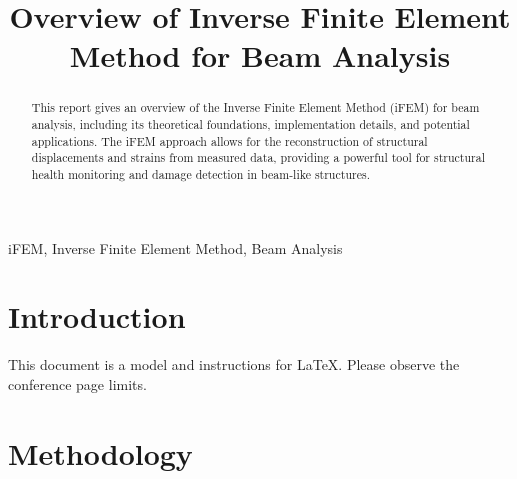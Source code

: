 \documentclass[conference]{IEEEtran}
\begin{document}
\title{Overview of Inverse Finite Element Method for Beam Analysis}



\author{
\and
{}
}

\maketitle

\begin{abstract}
This report gives an overview of the Inverse Finite Element Method (iFEM) for beam analysis, including its theoretical foundations, implementation details, and potential applications. The iFEM approach allows for the reconstruction of structural displacements and strains from measured data, providing a powerful tool for structural health monitoring and damage detection in beam-like structures.
\end{abstract}

\begin{IEEEkeywords}
iFEM, Inverse Finite Element Method, Beam Analysis
\end{IEEEkeywords}

\section{Introduction}
This document is a model and instructions for \LaTeX.
Please observe the conference page limits. 

\section{Methodology}
\end{document}
